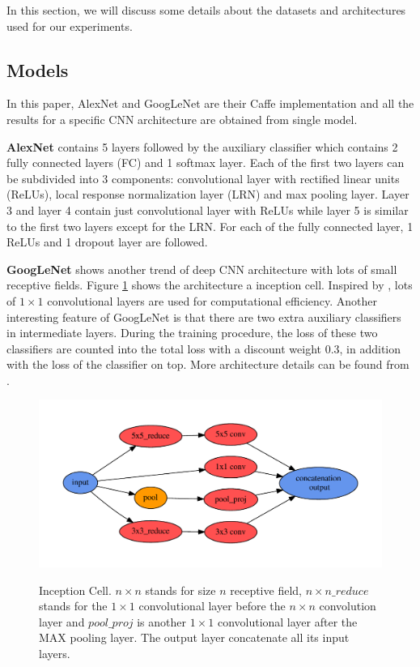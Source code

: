 ﻿In this section, we will discuss some details about the datasets and architectures used for our experiments.
\subsection{Models}
In this paper, AlexNet and GoogLeNet are their Caffe\cite{jia2014caffe} implementation and all the results for a specific CNN architecture are obtained from single model.

\textbf{AlexNet}
 contains 5 layers followed by the auxiliary classifier which contains 2 fully connected layers (FC) and 1 softmax layer. Each of the first two layers can be subdivided into 3 components: convolutional layer with rectified linear units (ReLUs), local response normalization layer (LRN) and max pooling layer. Layer 3 and layer 4 contain just convolutional layer with ReLUs while layer 5 is similar to the first two layers except for the LRN. For each of the fully connected layer, 1 ReLUs and 1 dropout\cite{srivastava2014dropout} layer are followed.

 \textbf{GoogLeNet}
  shows another trend of deep CNN architecture with lots of small receptive fields. Figure \ref{incept} shows the architecture a inception cell. Inspired by \cite{linNiN}, lots of $1\times 1$ convolutional layers are used for computational efficiency. Another interesting feature of GoogLeNet is that there are two extra auxiliary classifiers in intermediate layers. During the training procedure, the loss of these two classifiers are counted into the total loss with a discount weight 0.3, in addition with the loss of the classifier on top. More architecture details can be found from \cite{szegedy2014going}.

\begin{figure}
  \centering
  \includegraphics[scale=.45]{fig/inception.pdf}\\
  \caption{Inception Cell. $n\times n$ stands for size $n$ receptive field, $n\times n\_reduce$ stands for the $1\times 1$ convolutional layer before the $n\times n$ convolution layer and $pool\_proj$ is another $1\times 1$ convolutional layer after the MAX pooling layer. The output layer concatenate all its input layers.}\label{incept}
\end{figure}

